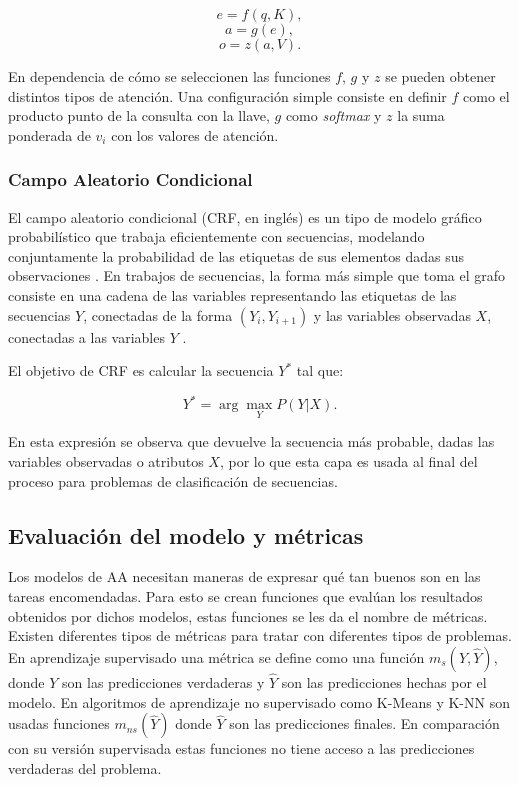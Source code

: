 \documentclass[a4paper,11pt,twocolumn,twoside]{article}
\begin{document}
\begin{equation}
	e = f(q, K),
\end{equation}
\begin{equation}
	a = g(e),
\end{equation}
\begin{equation}
	o = z(a, V).
\end{equation}

En dependencia de cómo se seleccionen las funciones $f$, $g$ y $z$ se pueden obtener distintos tipos de atención.
Una configuración simple consiste en definir $f$ como el producto punto de la consulta con la llave,
$g$ como \textit{softmax} y $z$ la suma ponderada de $v_i$ con los valores de atención.

\subsubsection{Campo Aleatorio Condicional}


El campo aleatorio condicional (CRF, en inglés) es un 
tipo de modelo gráfico probabilístico que trabaja eficientemente con secuencias,
modelando conjuntamente la probabilidad de las etiquetas de sus elementos dadas sus observaciones \cite{lafferty2001conditional}.
En trabajos de secuencias, la forma más simple que toma el grafo consiste en una cadena de las variables representando
las etiquetas de las secuencias $Y$, conectadas de la forma $(Y_i, Y_{i+1})$ y las variables observadas $X$, conectadas
a las variables $Y$ \cite{wallach2004conditional}.

El objetivo de CRF es calcular la secuencia $Y^*$ tal que:

\begin{equation}
	Y^* = \arg \max_Y P(Y | X).
	\label{eq:crf}
\end{equation}

En esta expresión se observa que devuelve la secuencia más probable, dadas las variables observadas o atributos $X$,
por lo que esta capa es usada al final del proceso para problemas de clasificación de secuencias.

\subsection{Evaluación del modelo y métricas}

Los modelos de AA necesitan maneras de expresar qué tan buenos son 
en las tareas encomendadas. Para esto se crean funciones que evalúan los resultados obtenidos
por dichos modelos, estas funciones se les da el nombre de métricas. Existen diferentes tipos de
métricas para tratar con diferentes tipos de problemas. En aprendizaje supervisado una métrica se
define como una función $m_s(Y, \hat{Y})$, donde $Y$ son las predicciones verdaderas y $\hat{Y}$ son las predicciones
hechas por el modelo. En algoritmos de aprendizaje no supervisado como K-Means y K-NN son usadas funciones $m_{ns}(\hat{Y})$
donde $\hat{Y}$ son las predicciones finales. En comparación con su versión supervisada estas funciones no tiene acceso
a las predicciones verdaderas del problema.
\end{document}
